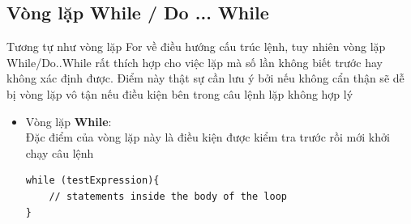 \documentclass[12pt,a4paper]{article}
\begin{document}
\subsection{Vòng lặp While / Do ... While}
Tương tự như vòng lặp For về điều hướng cấu trúc lệnh, tuy nhiên vòng lặp While/Do..While rất thích hợp cho việc lặp mà số lần không biết trước hay không xác định được. Điểm này thật sự cần lưu ý bởi nếu không cẩn thận sẽ dễ bị vòng lặp vô tận nếu điều kiện bên trong câu lệnh lặp không hợp lý
\begin{itemize}
	\item Vòng lặp \textbf{While}: \\
Đặc điểm của vòng lặp này là điều kiện được kiểm tra trước rồi mới khởi chạy câu lệnh
 \begin{lstlisting}
while (testExpression){
    // statements inside the body of the loop 
}
\end{lstlisting}


\end{itemize}
\end{document}
